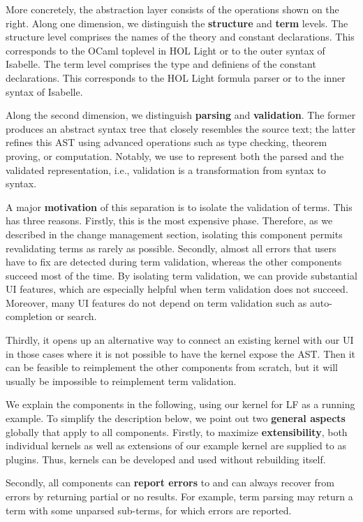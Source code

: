 More concretely, the abstraction layer consists of the  operations shown on the right.
Along one dimension, we distinguish the \textbf{structure} and \textbf{term} levels.
The structure level comprises the names of the theory and constant declarations.
This corresponds to the OCaml toplevel in HOL Light \cite{hollight} or to the outer syntax of Isabelle.
The term level comprises the type and definiens of the constant declarations.
This corresponds to the HOL Light formula parser or to the inner syntax of Isabelle.

Along the second dimension, we distinguish \textbf{parsing} and \textbf{validation}.
The former produces an abstract syntax tree that closely resembles the source text;
the latter refines this AST using advanced operations such as type checking, theorem proving, or computation.
Notably, we use \mmt to represent both the parsed and the validated representation, i.e., validation is a transformation from \mmt syntax to \mmt syntax.




A major \textbf{motivation} of this separation is to isolate the validation of terms.
This has three reasons.
Firstly, this is the most expensive phase.
Therefore, as we described in the change management section, isolating this component permits revalidating terms as rarely as possible.
Secondly, almost all errors that users have to fix are detected during term validation, whereas the other  components succeed most of the time.
By isolating term validation, we can provide substantial UI features, which are especially helpful when term validation does not succeed.
Moreover, many UI features do not depend on term validation such as auto-completion or search.


Thirdly, it opens up an alternative way to connect an existing kernel with our UI in those cases where it is not possible to have the kernel expose the AST.
Then it can be feasible to reimplement the other  components from scratch, but it will usually be impossible to reimplement term validation.

We explain the  components in the following, using our kernel for LF as a running example.
To simplify the description below, we point out two \textbf{general aspects} globally that apply to all  components.
Firstly, to maximize \textbf{extensibility}, both individual kernels as well as extensions of our example kernel are supplied to \jmmt as plugins.
Thus, kernels can be developed and used without rebuilding \jmmt itself.

Secondly, all  components can \textbf{report errors} to \jmmt and can always recover from errors by returning partial or no results.
For example, term parsing may return a term with some unparsed sub-terms, for which errors are reported.

